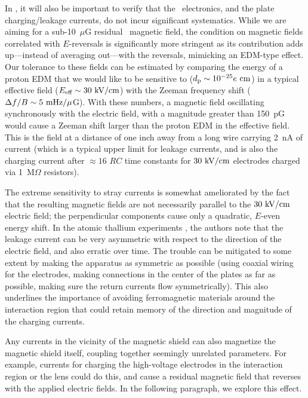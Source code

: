 In \CENTREX, it will also be important to verify that the \HV\ electronics, and
the plate charging/leakage currents, do not incur significant systematics. While
we are aiming for a sub-10~$\mu$G residual \DC\ magnetic field, the condition on
magnetic fields correlated with $E$-reversals is significantly more stringent as
its contribution adds up---instead of averaging out---with the reversals,
mimicking an \gls{EDM}-type effect. Our tolerance to these fields can be
estimated by comparing the energy of a proton \gls{EDM} that we would like to be
sensitive to ($d_\text{p}\sim10^{-25}e~\mathrm{cm}$) in a typical effective field
($E_\text{eff}\sim30~\mathrm{kV/cm}$) with the Zeeman frequency shift ($\Delta
f/B\sim5~\mathrm{mHz}/\mu$G). With these numbers, a magnetic field oscillating
synchronously with the electric field, with a magnitude greater than 150~pG
would cause a Zeeman shift larger than the proton \gls{EDM} in the effective
field. This is the field at a distance of one inch away from a long wire
carrying 2~nA of current (which is a typical upper limit for leakage currents,
and is also the charging current after $\approx16$ $RC$ time constants for
$30~\mathrm{kV/cm}$ electrodes charged via 1~M$\Omega$ resistors).

The extreme sensitivity to stray currents is somewhat ameliorated by the fact
that the resulting magnetic fields are not necessarily parallel to the $30~\mathrm{kV/cm}$
electric field; the perpendicular components cause only a quadratic, $E$-even
energy shift. In the atomic thallium experiments \cite{regan2001thesis}, the
authors note that the leakage current can be very asymmetric with respect to the
direction of the electric field, and also erratic over time. The trouble can be
mitigated to some extent by making the apparatus as symmetric as possible (using
coaxial wiring for the electrodes, making connections in the center of the
plates as far as possible, making sure the return currents flow symmetrically).
This also underlines the importance of avoiding ferromagnetic materials around
the interaction region that could retain memory of the direction and magnitude
of the charging currents.

Any currents in the vicinity of the magnetic shield can also magnetize the
magnetic shield itself, coupling together seemingly unrelated parameters. For
example, currents for charging the high-voltage electrodes in the interaction
region or the lens could do this, and cause a residual magnetic field that
reverses with the applied electric fields. In the following paragraph, we
explore this effect.

